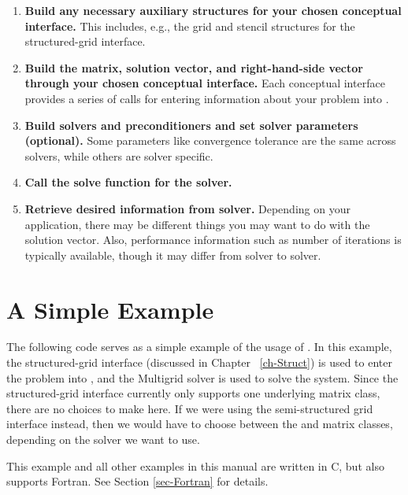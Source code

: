 \begin{enumerate}

\item
{\bf Build any necessary auxiliary structures for your chosen
conceptual interface.} This includes, e.g., the grid and stencil
structures for the structured-grid interface.

\item
{\bf Build the matrix, solution vector, and right-hand-side vector
through your chosen conceptual interface.}  Each conceptual interface
provides a series of calls for entering information about your problem
into \hypre{}.

\item
{\bf Build solvers and preconditioners and set solver parameters
(optional).}  Some parameters like convergence tolerance are the same
across solvers, while others are solver specific.

\item
{\bf Call the solve function for the solver.}

\item
{\bf Retrieve desired information from solver.} Depending on your
application, there may be different things you may want to do with the
solution vector.  Also, performance information such as number of
iterations is typically available, though it may differ from solver to
solver.

\end{enumerate}


\section{A Simple Example}
\label{sec-Simple-Example}

The following code serves as a simple example of the usage of \hypre{}.  In
this example, the structured-grid interface (discussed in Chapter
~\ref{ch-Struct}) is used to enter the problem into \hypre{}, and the
 Multigrid solver is used to solve the system.  Since the
structured-grid interface currently only supports one underlying matrix class,
there are no choices to make here.  If we were using the semi-structured grid
interface instead, then we would have to choose between the  and
 matrix classes, depending on the solver we want to use.

This example and all other examples in this manual are written in C,
but \hypre{} also supports Fortran.  See Section
\ref{sec-Fortran} for details.

